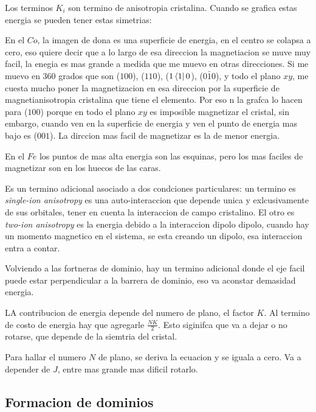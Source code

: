 \documentclass[11pt,fleqn]{book}
\begin{document}

Los terminos $K_{i}$ son termino de anisotropia cristalina. Cuando se grafica estas energia se pueden tener estas simetrias:


En el $Co$, la imagen de dona es una superficie de energia, en el centro se colapsa a cero, eso quiere decir que a lo largo de esa direccion la magnetiacion se muve muy facil, la enegia es mas grande a medida que me muevo en otras direcciones. Si me  muevo en 360 grados que son ($100$), ($110$), ($1\bra{1}0$), ($0\bar{1}0$), y todo el plano $xy$, me cuesta mucho poner la magnetizacion en esa direccion por la superficie de magnetianisotropia cristalina que tiene el elemento. Por eso n la grafca lo hacen para ($100$) porque en todo  el plano $xy$ es imposible magnetizar el cristal, sin embargo, cuando ven en la superficie de energia y ven el punto de energia mas bajo es ($001$). La dirccion mas facil de magnetizar es la de menor energia.

En el $Fe$ los puntos de mas alta energia son las esquinas, pero los mas faciles de magnetizar son en los huecos de las caras. 

Es un termino adicional asociado a dos condciones particulares: un termino es \emph{single-ion anisotropy} es una auto-interaccion que depende unica y exlcusivamente de sus orbitales, tener en cuenta la interaccion de campo cristalino. El otro es \emph{two-ion anisotropy} es la energia debido a la interaccion dipolo dipolo, cuando hay un momento magnetico en el sistema, se esta creando un dipolo, esa interaccion entra a contar. 

Volviendo a las fortneras de dominio, hay un termino adicional donde el eje facil puede estar perpendicular a la barrera de dominio, eso va aconstar demasidad energia. 


LA contribucion de energia depende del numero de plano, el factor $K$. Al termino de costo de energia  hay que agregarle $\frac{NK}{2}$. Esto siginifca que va a dejar o no rotarse, que depende de la siemtria del cristal.

Para hallar el numero $N$ de plano, se deriva la ecuacion y se iguala a cero. Va a depender de $J$, entre mas grande mas dificil rotarlo.

\subsection{Formacion de dominios}
\end{document}
